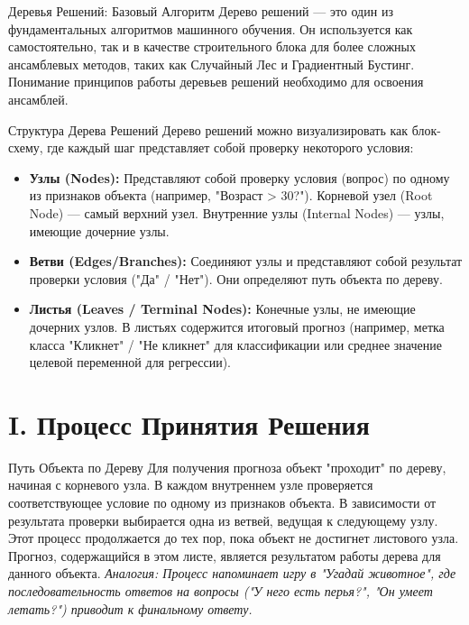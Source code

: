 
\begin{textbox}{Деревья Решений: Базовый Алгоритм}
    Дерево решений — это один из фундаментальных алгоритмов машинного обучения. Он используется как самостоятельно, так и в качестве строительного блока для более сложных ансамблевых методов, таких как Случайный Лес и Градиентный Бустинг. Понимание принципов работы деревьев решений необходимо для освоения ансамблей.
\end{textbox}

\begin{myblock}{Структура Дерева Решений}
    Дерево решений можно визуализировать как блок-схему, где каждый шаг представляет собой проверку некоторого условия:
    \begin{itemize}[nosep, leftmargin=*]
        \item \textbf{Узлы (Nodes):} Представляют собой проверку условия (вопрос) по одному из признаков объекта (например, "Возраст > 30?"). Корневой узел (Root Node) — самый верхний узел. Внутренние узлы (Internal Nodes) — узлы, имеющие дочерние узлы.
        \item \textbf{Ветви (Edges/Branches):} Соединяют узлы и представляют собой результат проверки условия ("Да" / "Нет"). Они определяют путь объекта по дереву.
        \item \textbf{Листья (Leaves / Terminal Nodes):} Конечные узлы, не имеющие дочерних узлов. В листьях содержится итоговый прогноз (например, метка класса "Кликнет" / "Не кликнет" для классификации или среднее значение целевой переменной для регрессии).
    \end{itemize}
\end{myblock}

\section{I. Процесс Принятия Решения}

\begin{myblock}{Путь Объекта по Дереву}
    Для получения прогноза объект "проходит" по дереву, начиная с корневого узла. В каждом внутреннем узле проверяется соответствующее условие по одному из признаков объекта. В зависимости от результата проверки выбирается одна из ветвей, ведущая к следующему узлу. Этот процесс продолжается до тех пор, пока объект не достигнет листового узла. Прогноз, содержащийся в этом листе, является результатом работы дерева для данного объекта.
    \textit{Аналогия: Процесс напоминает игру в "Угадай животное", где последовательность ответов на вопросы ("У него есть перья?", "Он умеет летать?") приводит к финальному ответу.}
\end{myblock}

